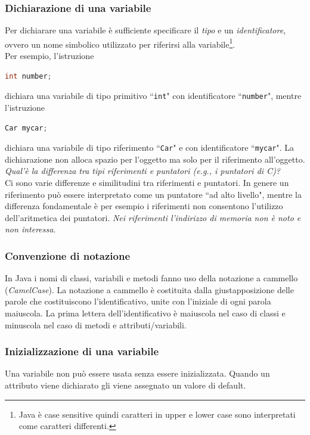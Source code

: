 \documentclass{article}
\theoremstyle{definition}
\begin{document}
\subsubsection{Dichiarazione di una variabile}
Per dichiarare una variabile \`e sufficiente specificare il \emph{tipo} e un \emph{identificatore}, ovvero un nome simbolico utilizzato per riferirsi alla variabile\footnote{Java \`e case sensitive quindi caratteri in upper e lower case sono interpretati come caratteri differenti.}. \\
Per esempio, l'istruzione
\begin{lstlisting}[language=Java,escapechar=|]
int number;
\end{lstlisting}
dichiara una variabile di tipo primitivo ``\texttt{int}" con identificatore ``\texttt{number}", mentre l'istruzione
\begin{lstlisting}[language=Java,escapechar=|]
Car mycar;
\end{lstlisting}
dichiara una variabile di tipo riferimento ``\texttt{Car}" e con identificatore ``\texttt{mycar}".
La dichiarazione non alloca spazio per l'oggetto ma solo per il riferimento all'oggetto. \\

\emph{Qual'è la differenza tra tipi riferimenti e puntatori (e.g., i puntatori di C)?}\\
Ci sono varie differenze e similitudini tra riferimenti e puntatori. In genere un riferimento pu\`o essere interpretato come un puntatore ``ad alto livello", mentre la differenza fondamentale \`e per esempio i riferimenti non consentono l'utilizzo dell'aritmetica dei puntatori. 
\emph{Nei riferimenti l'indirizzo di memoria non \`e noto e non interessa}.

\subsubsection{Convenzione di notazione}
In Java i nomi di classi, variabili e metodi fanno uso della notazione a cammello (\emph{CamelCase}).
La notazione a cammello \`e costituita dalla giustapposizione delle parole che costituiscono l'identificativo, unite con l'iniziale di ogni parola maiuscola. 
La prima lettera dell'identificativo è maiuscola nel caso di classi e minuscola nel caso di metodi e attributi/variabili. 

\subsubsection{Inizializzazione di una variabile}
Una variabile non pu\`o essere usata senza essere inizializzata. Quando un attributo viene dichiarato gli viene assegnato un valore di default.
\end{document}
